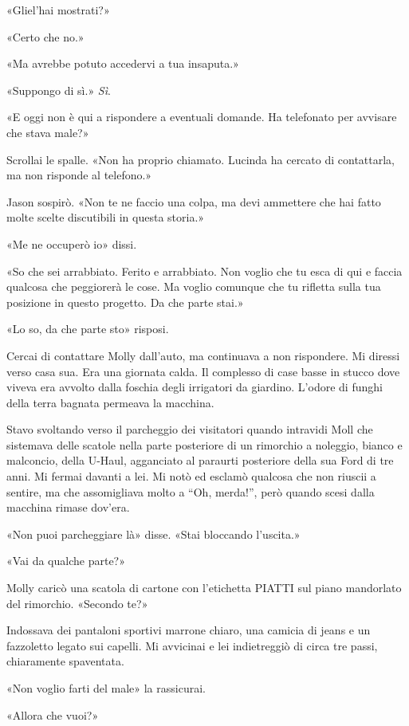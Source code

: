 «Gliel'hai mostrati?»

«Certo che no.»

«Ma avrebbe potuto accedervi a tua insaputa.»

«Suppongo di sì.» \emph{Sì}.

«E oggi non è qui a rispondere a eventuali domande. Ha telefonato per
avvisare che stava male?»

Scrollai le spalle. «Non ha proprio chiamato. Lucinda ha cercato di
contattarla, ma non risponde al telefono.»

Jason sospirò. «Non te ne faccio una colpa, ma devi ammettere che hai
fatto molte scelte discutibili in questa storia.»

«Me ne occuperò io» dissi.

«So che sei arrabbiato. Ferito e arrabbiato. Non voglio che tu esca di
qui e faccia qualcosa che peggiorerà le cose. Ma voglio comunque che tu
rifletta sulla tua posizione in questo progetto. Da che parte stai.»

«Lo so, da che parte sto» risposi.

\separatorefiori

Cercai di contattare Molly dall'auto, ma continuava a non rispondere. Mi
diressi verso casa sua. Era una giornata calda. Il complesso di case
basse in stucco dove viveva era avvolto dalla foschia degli irrigatori
da giardino. L'odore di funghi della terra bagnata permeava la macchina.

Stavo svoltando verso il parcheggio dei visitatori quando intravidi Moll
che sistemava delle scatole nella parte posteriore di un rimorchio a
noleggio, bianco e malconcio, della U-Haul, agganciato al paraurti
posteriore della sua Ford di tre anni. Mi fermai davanti a lei. Mi notò
ed esclamò qualcosa che non riuscii a sentire, ma che assomigliava molto
a ``Oh, merda!'', però quando scesi dalla macchina rimase dov'era.

«Non puoi parcheggiare là» disse. «Stai bloccando l'uscita.»

«Vai da qualche parte?»

Molly caricò una scatola di cartone con l'etichetta {PIATTI} sul piano
mandorlato del rimorchio. «Secondo te?»

Indossava dei pantaloni sportivi marrone chiaro, una camicia di jeans e
un fazzoletto legato sui capelli. Mi avvicinai e lei indietreggiò di
circa tre passi, chiaramente spaventata.

«Non voglio farti del male» la rassicurai.

«Allora che vuoi?»

